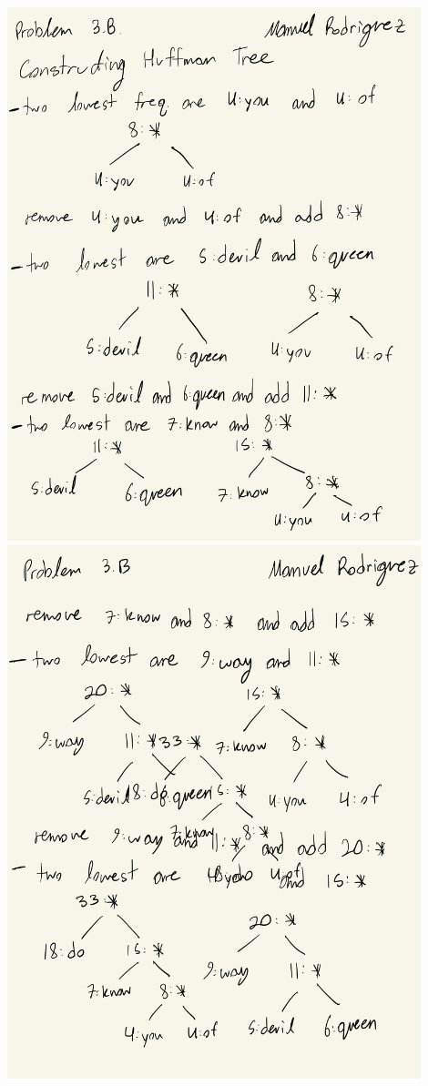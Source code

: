 \begin{solution}
	\\ \includegraphics[width=12cm]{plots/CS 155 PS5-2.jpg}
	\\ \includegraphics[width=12cm]{plots/CS 155 PS5-3.jpg}

\end{solution}
